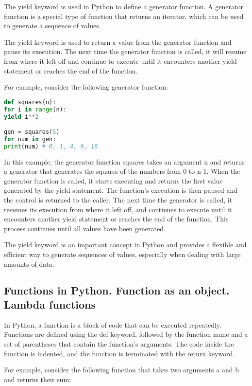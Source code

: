 \documentclass[12pt, a4paper, oneside]{article}
\begin{document}
The yield keyword is used in Python to define a generator function. A generator function is a special type of function that returns an iterator, which can be used to generate a sequence of values.

The yield keyword is used to return a value from the generator function and pause its execution. The next time the generator function is called, it will resume from where it left off and continue to execute until it encounters another yield statement or reaches the end of the function.

For example, consider the following generator function:

\begin{lstlisting}[language=Python, frame=single]
def squares(n):
for i in range(n):
yield i**2

gen = squares(5)
for num in gen:
print(num) # 0, 1, 4, 9, 16
\end{lstlisting}

In this example, the generator function squares takes an argument n and returns a generator that generates the squares of the numbers from 0 to n-1. When the generator function is called, it starts executing and returns the first value generated by the yield statement. The function's execution is then paused and the control is returned to the caller. The next time the generator is called, it resumes its execution from where it left off, and continues to execute until it encounters another yield statement or reaches the end of the function. This process continues until all values have been generated.

The yield keyword is an important concept in Python and provides a flexible and efficient way to generate sequences of values, especially when dealing with large amounts of data.




\subsection{ Functions in Python. Function as an object. Lambda functions }
In Python, a function is a block of code that can be executed repeatedly. Functions are defined using the def keyword, followed by the function name and a set of parentheses that contain the function's arguments. The code inside the function is indented, and the function is terminated with the return keyword.

For example, consider the following function that takes two arguments a and b and returns their sum:
\end{document}
